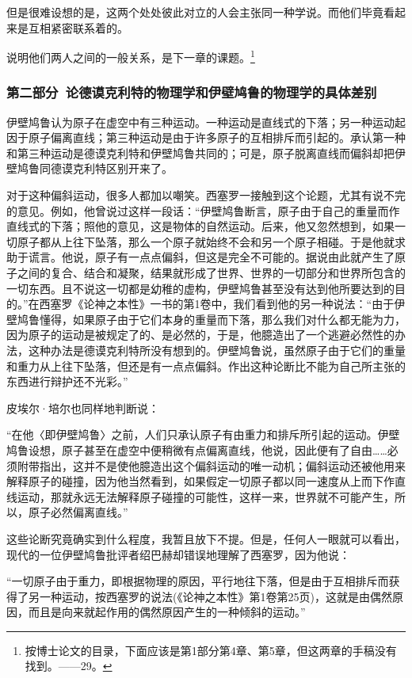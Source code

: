 \documentclass[a4paper,twoside,12pt,AutoFakeBold]{ctexart}
\begin{document}
但是很难设想的是，这两个处处彼此对立的人会主张同一种学说。而他们毕竟看起来是互相紧密联系着的。

说明他们两人之间的一般关系，是下一章的课题。\footnote{按博士论文的目录，下面应该是第1部分第4章、第5章，但这两章的手稿没有找到。——29。}

\subsubsection{第二部分~论德谟克利特的物理学和伊壁鸠鲁的物理学的具体差别}

 伊壁鸠鲁认为原子在虚空中有三种运动。一种运动是直线式的下落；另一种运动起因于原子偏离直线；第三种运动是由于许多原子的互相排斥而引起的。承认第一种和第三种运动是德谟克利特和伊壁鸠鲁共同的；可是，原子脱离直线而偏斜却把伊壁鸠鲁同德谟克利特区别开来了。

对于这种偏斜运动，很多人都加以嘲笑。西塞罗一接触到这个论题，尤其有说不完的意见。例如，他曾说过这样一段话：“伊壁鸠鲁断言，原子由于自己的重量而作直线式的下落；照他的意见，这是物体的自然运动。后来，他又忽然想到，如果一切原子都从上往下坠落，那么一个原子就始终不会和另一个原子相碰。于是他就求助于谎言。他说，原子有一点点偏斜，但这是完全不可能的。据说由此就产生了原子之间的复合、结合和凝聚，结果就形成了世界、世界的一切部分和世界所包含的一切东西。且不说这一切都是幼稚的虚构，伊壁鸠鲁甚至没有达到他所要达到的目的。”在西塞罗《论神之本性》一书的第1卷中，我们看到他的另一种说法：“由于伊壁鸠鲁懂得，如果原子由于它们本身的重量而下落，那么我们对什么都无能为力，因为原子的运动是被规定了的、是必然的，于是，他臆造出了一个逃避必然性的办法，这种办法是德谟克利特所没有想到的。伊壁鸠鲁说，虽然原子由于它们的重量和重力从上往下坠落，但还是有一点点偏斜。作出这种论断比不能为自己所主张的东西进行辩护还不光彩。”

皮埃尔·培尔也同样地判断说：

\begin{fangsong}
    “在他〈即伊壁鸠鲁〉之前，人们只承认原子有由重力和排斥所引起的运动。伊壁鸠鲁设想，原子甚至在虚空中便稍微有点偏离直线，他说，因此便有了自由……必须附带指出，这并不是使他臆造出这个偏斜运动的唯一动机；偏斜运动还被他用来解释原子的碰撞，因为他当然看到，如果假定一切原子都以同一速度从上而下作直线运动，那就永远无法解释原子碰撞的可能性，这样一来，世界就不可能产生，所以，原子必然偏离直线。”
\end{fangsong}

这些论断究竟确实到什么程度，我暂且放下不提。但是，任何人一眼就可以看出，现代的一位伊壁鸠鲁批评者绍巴赫却错误地理解了西塞罗，因为他说：

\begin{fangsong}
    “一切原子由于重力，即根据物理的原因，平行地往下落，但是由于互相排斥而获得了另一种运动，按西塞罗的说法(《论神之本性》第1卷第25页)，这就是由偶然原因，而且是向来就起作用的偶然原因产生的一种倾斜的运动。”
\end{fangsong}
\end{document}

